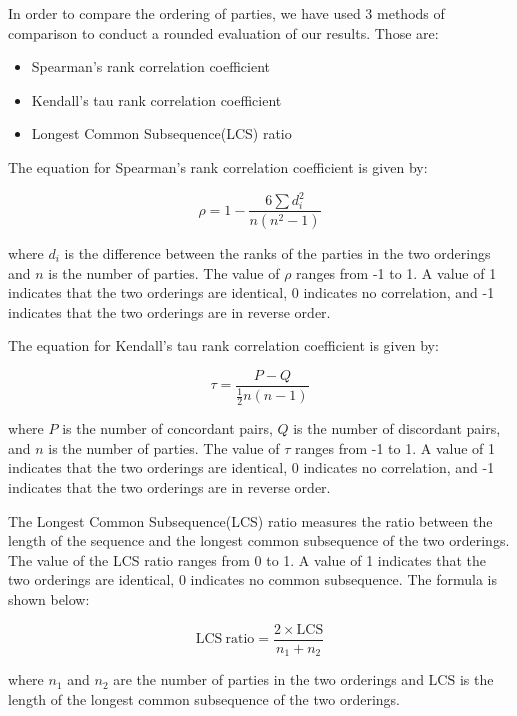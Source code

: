 \documentclass[final,5p,times,twocolumn,authoryear]{elsarticle}
\begin{document}
In order to compare the ordering of parties, we have used 3 methods of comparison to conduct a rounded evaluation of our results. Those are:
\begin{itemize}
	\item Spearman's rank correlation coefficient\citep{spearman1904}
	\item Kendall's tau rank correlation coefficient\citep{kendall1938}
	\item Longest Common Subsequence(LCS) ratio
\end{itemize}

The equation for Spearman's rank correlation coefficient is given by:

\begin{center}
	\[	\rho = 1 - \frac{6\sum d_i^2}{n(n^2-1)} \]
	
\end{center}



where $d_i$ is the difference between the ranks of the parties in the two orderings and $n$ is the number of parties. The value of $\rho$ ranges from -1 to 1. A value of 1 indicates that the two orderings are identical, 0 indicates no correlation, and -1 indicates that the two orderings are in reverse order. 

The equation for Kendall's tau rank correlation coefficient is given by:

\begin{center}
	\[	\tau = \frac{P-Q}{\frac{1}{2}n(n-1)} \]
\end{center}

where $P$ is the number of concordant pairs, $Q$ is the number of discordant pairs, and $n$ is the number of parties. The value of $\tau$ ranges from -1 to 1. A value of 1 indicates that the two orderings are identical, 0 indicates no correlation, and -1 indicates that the two orderings are in reverse order.

The Longest Common Subsequence(LCS) ratio measures the ratio between the length of the sequence and the longest common subsequence of the two orderings. The value of the LCS ratio ranges from 0 to 1. A value of 1 indicates that the two orderings are identical, 0 indicates no common subsequence. The formula is shown below:
\begin{center}
  \[	\mathrm{LCS\ ratio} = \frac{2 \times \mathrm{LCS}}{n_1 + n_2} \]
\end{center}

where $n_1$ and $n_2$ are the number of parties in the two orderings and $\mathrm{LCS}$ is the length of the longest common subsequence of the two orderings.
\end{document}
